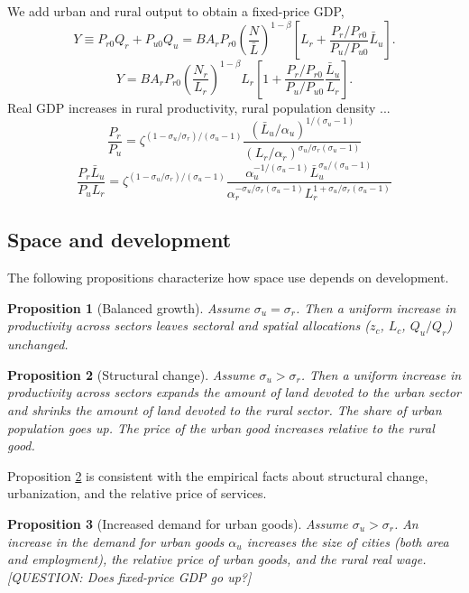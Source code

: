 \documentclass[12pt]{article}
\newtheorem{proposition}{Proposition}
\begin{document}
We add urban and rural output to obtain a fixed-price GDP,
\begin{equation}
	Y \equiv
	P_{r0}Q_r + P_{u0}Q_u
	=
	B A_r P_{r0}\left(\frac {N}
	{{\bar L}}
\right)^{1-\beta}
\left[
L_r
+
\frac{P_r/P_{r0}}{P_u/P_{u0}}
\bar L_u\right].
\end{equation}
\[
	Y =
	B A_r P_{r0}\left(\frac {N_r}
	{L_r}
\right)^{1-\beta} L_r
\left[
1
+
\frac{P_r/P_{r0}}{P_u/P_{u0}}
\frac{\bar L_u}{L_r}
\right].
\]
Real GDP increases in rural productivity, rural population density ...
\[
\frac {P_r}{P_u}
=
\zeta^{(1-\sigma_u/\sigma_r)/(\sigma_u-1)}
\frac {(\bar L_u/\alpha_u)^{1/(\sigma_u-1)}}
{(L_r/\alpha_r)^{\sigma_u/\sigma_r(\sigma_u-1)}}
\]
\[
\frac {P_r \bar L_u}{P_uL_r}
=
\zeta^{(1-\sigma_u/\sigma_r)/(\sigma_u-1)}
\frac {\alpha_u^{-1/(\sigma_u-1)}\bar L_u^{\sigma_u/(\sigma_u-1)}}
{\alpha_r^{-\sigma_u/\sigma_r(\sigma_u-1)}
L_r^{1+\sigma_u/\sigma_r(\sigma_u-1)}}
\]

\subsection{Space and development}
The following propositions characterize how space use depends on development.
\begin{proposition}[Balanced growth]\label{prop:balanced_growth}
Assume $\sigma_u=\sigma_r$. Then a uniform increase in productivity across sectors leaves sectoral and spatial allocations ($z_c$, $L_c$, $Q_u/Q_r$) unchanged.
\end{proposition}

\begin{proposition}[Structural change]\label{prop:comparative_static}
Assume $\sigma_u>\sigma_r$. Then a uniform increase in productivity across sectors expands the amount of land devoted to the urban sector and shrinks the amount of land devoted to the rural sector. The share of urban population goes up. The price of the urban good increases relative to the rural good.
\end{proposition}

Proposition \ref{prop:comparative_static} is consistent with the empirical facts about structural change, urbanization, and the relative price of services.

\begin{proposition}[Increased demand for urban goods]\label{prop:demand}
Assume $\sigma_u>\sigma_r$. An increase in the demand for urban goods $\alpha_u$ increases the size of cities (both area and employment), the relative price of urban goods, and the rural real wage. [QUESTION: Does fixed-price GDP go up?]
\end{proposition}
\end{document}
